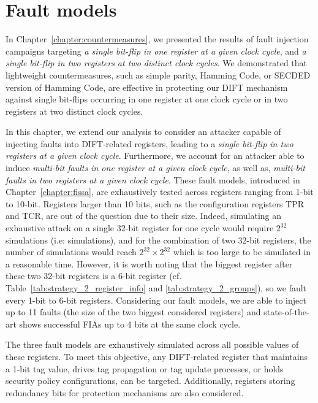 \section{Fault models}
\label{section:chap6_faultmodels}
In Chapter~\ref{chapter:countermeasures}, we presented the results of fault injection campaigns targeting \textit{a single bit-flip in one register at a given clock cycle}, and \textit{a single bit-flip in two registers at two distinct clock cycles}. We demonstrated that lightweight countermeasures, such as simple parity, Hamming Code, or SECDED version of Hamming Code, are effective in protecting our DIFT mechanism against single bit-flips occurring in one register at one clock cycle or in two registers at two distinct clock cycles.

In this chapter, we extend our analysis to consider an attacker capable of injecting faults into DIFT-related registers, leading to a \textit{single bit-flip in two registers at a given clock cycle}. Furthermore, we account for an attacker able to induce \textit{multi-bit faults in one register at a given clock cycle}, as well as, \textit{multi-bit faults in two registers at a given clock cycle}. These fault models, introduced in Chapter~\ref{chapter:fissa}, are exhaustively tested across registers ranging from 1-bit to 10-bit. Registers larger than 10 bits, such as the configuration registers TPR and TCR, are out of the question due to their size. Indeed, simulating an exhaustive attack on a single 32-bit register for one cycle would require $2^{32}$ simulations (i.e:  simulations), and for the combination of two 32-bit registers, the number of simulations would reach $2^{32} \times 2^{32}$ which is too large to be simulated in a reasonable time. However, it is worth noting that the biggest register after these two 32-bit registers is a 6-bit register (cf. Table~\ref{tab:strategy_2_register_info} and \ref{tab:strategy_2_groups}), so we fault every 1-bit to 6-bit registers. Considering our fault models, we are able to inject up to 11 faults (the size of the two biggest considered registers) and state-of-the-art shows successful FIAs up to 4 bits at the same clock cycle.

The three fault models are exhaustively simulated across all possible values of these registers. To meet this objective, any DIFT-related register that maintains a 1-bit tag value, drives tag propagation or tag update processes, or holds security policy configurations, can be targeted. Additionally, registers storing redundancy bits for protection mechanisms are also considered.

